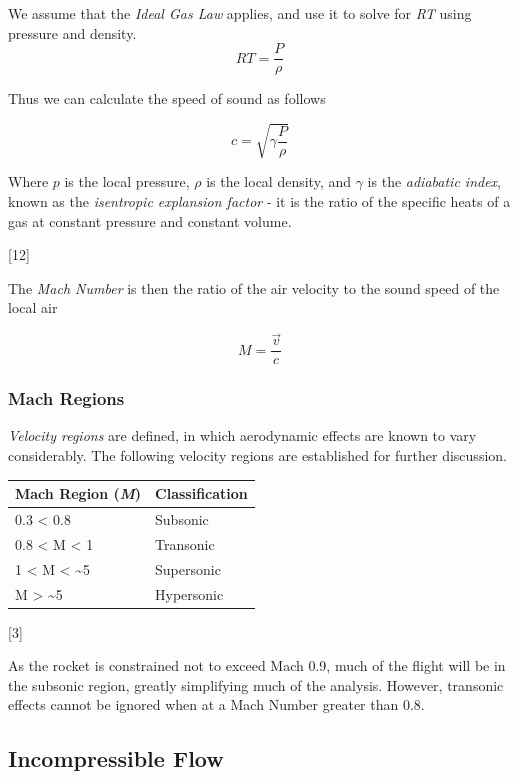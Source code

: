 \documentclass[]{article}
\begin{document}
We assume that the \emph{Ideal Gas Law} applies, and use it to solve for
\emph{RT} using pressure and density. \[ RT = \dfrac{P}{\rho} \]

Thus we can calculate the speed of sound as follows

\begin{equation}
\label{speed_of_sound}
c = \sqrt{\gamma \dfrac{P}{\rho} } 
\end{equation}

Where \(p\) is the local pressure, \(\rho\) is the local density, and
\(\gamma\) is the \emph{adiabatic index}, known as the \emph{isentropic
explansion factor} - it is the ratio of the specific heats of a gas at
constant pressure and constant volume.

{[}12{]}

The \emph{Mach Number} is then the ratio of the air velocity to the
sound speed of the local air

\begin{equation}
M = \dfrac{ \vec{v} } { c }
\end{equation}

\subsubsection{Mach Regions}\label{mach-regions}

\emph{Velocity regions} are defined, in which aerodynamic effects are
known to vary considerably. The following velocity regions are
established for further discussion.

\begin{longtable}[c]{@{}ll@{}}
\toprule
Mach Region (\emph{M}) & Classification\tabularnewline
\midrule
\endhead
0.3 \textless{} 0.8 & Subsonic\tabularnewline
0.8 \textless{} M \textless{} 1 & Transonic\tabularnewline
1 \textless{} M \textless{} \textasciitilde{}5 &
Supersonic\tabularnewline
M \textgreater{} \textasciitilde{}5 & Hypersonic\tabularnewline
\bottomrule
\end{longtable}


{[}3{]}

As the rocket is constrained not to exceed Mach 0.9, much of the flight
will be in the subsonic region, greatly simplifying much of the
analysis. However, transonic effects cannot be ignored when at a Mach
Number greater than 0.8.

\clearpage

\subsection{Incompressible Flow}\label{incompressible-flow}
\end{document}
